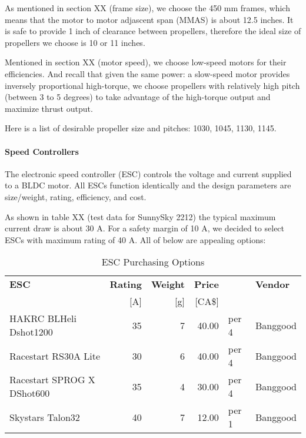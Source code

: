 As mentioned in section XX (frame size), we choose the 450 mm frames, which means that the motor to motor 
adjascent span (MMAS) is about 12.5 inches. It is safe to provide 1 inch of clearance between propellers, 
therefore the ideal size of propellers we choose is 10 or 11 inches.

Mentioned in section XX (motor speed), we choose low-speed motors for their efficiencies. And recall that 
given the same power: a slow-speed motor provides inversely proportional high-torque, we choose propellers 
with relatively high pitch (between 3 to 5 degrees) to take advantage of the high-torque output and 
maximize thrust output.

Here is a list of desirable propeller size and pitches: 1030, 1045, 1130, 1145.

\paragraph{Speed Controllers}

The electronic speed controller (ESC) controls the voltage and current supplied to a BLDC motor. All ESCs 
function identically and the design parameters are size/weight, rating, efficiency, and cost.

As shown in table XX (test data for SunnySky 2212) the typical maximum current draw is about 30 A. For a 
safety margin of 10 A, we decided to select ESCs with maximum rating of 40 A. All of below are appealing 
options:

\begin{table}[H]
    \centering
    \caption{ESC Purchasing Options}
    \label{table:esc-table}

    \begin{tabular}{lrrrll}

    \hline
    \textbf{ESC} & \textbf{Rating} & \textbf{Weight} & \textbf{Price}  & & \textbf{Vendor}\\
    & [A] & [g] & [CA\$] & & \\
    \hline
    HAKRC BLHeli Dshot1200 & 35 & 7  & 40.00 & per 4 & Banggood\\
    Racestart RS30A Lite & 30 & 6  & 40.00 & per 4 & Banggood\\
    Racestart SPROG X DShot600 & 35 & 4  & 30.00 & per 4 & Banggood\\
    Skystars Talon32 & 40 & 7  & 12.00 & per 1 & Banggood\\
    \hline

    \end{tabular} 
\end{table}

